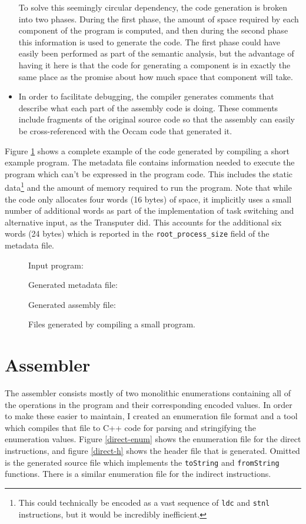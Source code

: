 \begin{itemize}
    To solve this seemingly circular dependency, the code generation is broken
    into two phases. During the first phase, the amount of space required by
    each component of the program is computed, and then during the second phase
    this information is used to generate the code. The first phase could have
    easily been performed as part of the semantic analysis, but the advantage of
    having it here is that the code for generating a component is in exactly the
    same place as the promise about how much space that component will take.
  \item
    In order to facilitate debugging, the compiler generates comments that
    describe what each part of the assembly code is doing. These comments
    include fragments of the original source code so that the assembly can
    easily be cross-referenced with the Occam code that generated it.
\end{itemize}

Figure \ref{code-example} shows a complete example of the code generated by
compiling a short example program. The metadata file contains information needed
to execute the program which can't be expressed in the program code. This
includes the static data\footnote{This could technically be encoded as a vast
sequence of \texttt{ldc} and \texttt{stnl} instructions, but it would be
incredibly inefficient.} and the amount of memory required to run the program.
Note that while the code only allocates four words (16 bytes) of space, it
implicitly uses a small number of additional words as part of the implementation
of task switching and alternative input, as the Transputer did. This accounts
for the additional six words (24 bytes) which is reported in the
\texttt{root\_process\_size} field of the metadata file.

\begin{figure}[p]
  Input program:
  
  Generated metadata file:
  
  Generated assembly file:
  
  \caption{Files generated by compiling a small program.}
  \label{code-example}
\end{figure}

\section{Assembler} \label{assembler}

The assembler consists mostly of two monolithic enumerations containing all of
the operations in the program and their corresponding encoded values. In order
to make these easier to maintain, I created an enumeration file format and
a tool which compiles that file to C++ code for parsing and stringifying the
enumeration values. Figure \ref{direct-enum} shows the enumeration file for the
direct instructions, and figure \ref{direct-h} shows the header file that is
generated. Omitted is the generated source file which implements the
\texttt{toString} and \texttt{fromString} functions. There is a similar
enumeration file for the indirect instructions.

